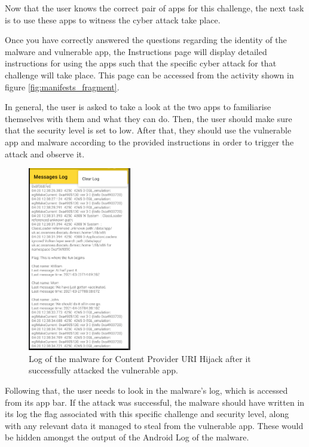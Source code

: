     Now that the user knows the correct pair of apps for this challenge, the next task is to use these apps to witness the cyber attack take place.
    
    Once you have correctly answered the questions regarding the identity of the malware and vulnerable app, the Instructions page will display detailed instructions for using the apps such that the specific cyber attack for that challenge will take place. This page can be accessed from the activity shown in figure \ref{fig:manifests_fragment}.
    
    In general, the user is asked to take a look at the two apps to familiarise themselves with them and what they can do. Then, the user should make sure that the security level is set to low. After that, they should use the vulnerable app and malware according to the provided instructions in order to trigger the attack and observe it. 
    
    \begin{figure}
        \centering
        \includegraphics[width=0.4\textwidth]{graphics/log.PNG}
        \caption{Log of the malware for Content Provider URI Hijack after it successfully attacked the vulnerable app.}
        \label{fig:malware_log}
    \end{figure}
    
    Following that, the user needs to look in the malware's log, which is accessed from its app bar. If the attack was successful, the malware should have written in its log the flag associated with this specific challenge and security level, along with any relevant data it managed to steal from the vulnerable app. These would be hidden amongst the output of the Android Log of the malware. 
    
